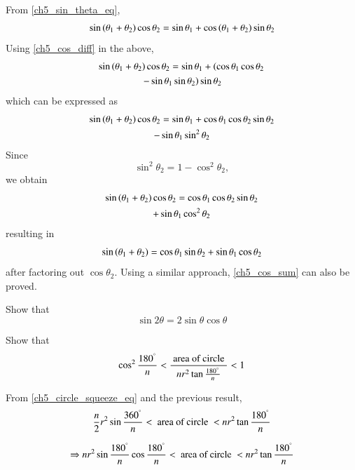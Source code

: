 %
\proof From \eqref{ch5_sin_theta_eq},
%
\begin{align}
 \sin \left(\theta_1 + \theta_2\right)\cos \theta_2 =\sin  \theta_1 +\cos\left(\theta_1+\theta_2\right)\sin\theta_2 
\end{align}
%
Using \eqref{ch5_cos_diff} in the above,
%
\begin{multline}
\sin \left(\theta_1 + \theta_2\right)\cos \theta_2 
=\sin  \theta_1 +\left(\cos \theta_1\cos\theta_2 \right.
\\	
\left.	- \sin \theta_1\sin\theta_2\right)\sin\theta_2 
\end{multline}
%
which can be expressed as
%
\begin{multline}
\sin \left(\theta_1 + \theta_2\right)\cos \theta_2 
=\sin  \theta_1 +\cos \theta_1\cos\theta_2 \sin\theta_2 
\\	
	- \sin \theta_1\sin^2\theta_2
\end{multline}
%
Since
%
\begin{equation}
\sin^2\theta_2 = 1- \cos^2\theta_2, 
\end{equation}
%
we obtain
%
\begin{multline}
\sin \left(\theta_1 + \theta_2\right)\cos \theta_2 
=\cos \theta_1\cos\theta_2 \sin\theta_2 
\\	
+ \sin \theta_1\cos^2\theta_2
\end{multline}
%
resulting in
%
\begin{equation}
\sin \left(\theta_1 + \theta_2\right)
=\cos \theta_1 \sin\theta_2 
+ \sin \theta_1\cos\theta_2
\end{equation}
%
after factoring out $\cos \theta_2$.  Using a similar approach, \eqref{ch5_cos_sum} can also be proved.
%
\begin{problem}
	Show that
	\begin{equation}
	\sin 2\theta = 2 \sin\theta \cos\theta
	\end{equation}
\end{problem}
\begin{problem}
Show that
	\begin{equation}
	\label{ch5_circle_squeeze_simple}
\cos^2\frac{180^{\degree}}{n} < \frac{\text{ area of circle }}{nr^{2}\tan\frac{180^{\degree}}{n}} < 1	\end{equation}
\end{problem}
\proof From \eqref{ch5_circle_squeeze_eq} and the previous result,
	\begin{multline}
	\frac{n}{2}r^{2}\sin\frac{360^{\degree}}{n} < \text{ area of circle } < nr^{2}\tan\frac{180^{\degree}}{n}
	\end{multline}
	\begin{small}
	\begin{multline}
\Rightarrow 	
	{n}r^{2}\sin\frac{180^{\degree}}{n}\cos\frac{180^{\degree}}{n} < \text{ area of circle } < nr^{2}\tan\frac{180^{\degree}}{n} 
	\end{multline}
	\end{small}
	
